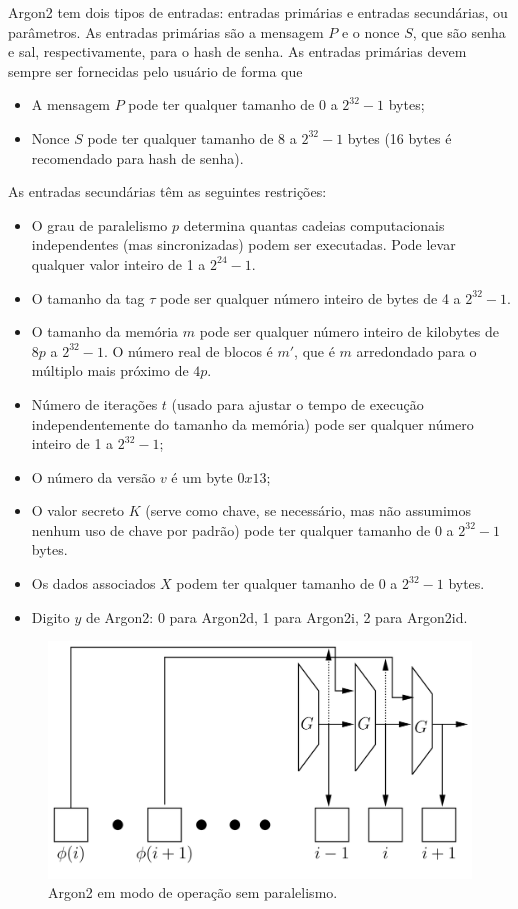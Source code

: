 \documentclass[conference]{IEEEtran}
\begin{document}
Argon2 tem dois tipos de entradas: entradas primárias e entradas secundárias, ou parâmetros. 
As entradas primárias são a mensagem $P$ e o nonce $S$, que são senha e sal, respectivamente, para o 
hash de senha. As entradas primárias devem sempre ser fornecidas pelo usuário de forma que
\begin{itemize}
\item A mensagem $P$ pode ter qualquer tamanho de $0$ a $2^{32}-1$ bytes;
\item Nonce $S$ pode ter qualquer tamanho de $8$ a $2^{32}-1$ bytes (16 bytes é recomendado para hash de senha).
\end{itemize}
As entradas secundárias têm as seguintes restrições:
\begin{itemize}
\item O grau de paralelismo $p$ determina quantas cadeias computacionais independentes (mas sincronizadas) 
podem ser executadas. Pode levar qualquer valor inteiro de 1 a $2^{24}-1$.
\item O tamanho da tag $\tau$ pode ser qualquer número inteiro de bytes de 4 a $2^{32}-1$.
\item O tamanho da memória $m$ pode ser qualquer número inteiro de kilobytes de $8p$ a $2^{32}-1$. O número 
real de blocos é $m'$, que é $m$ arredondado para o múltiplo mais próximo de $4p$.
\item Número de iterações $t$ (usado para ajustar o tempo de execução independentemente do tamanho da memória) 
pode ser qualquer número inteiro de 1 a $2^{32}-1$;
\item O número da versão $v$ é um byte $0x13$;
\item O valor secreto $K$ (serve como chave, se necessário, mas não assumimos nenhum uso de chave por padrão) 
pode ter qualquer tamanho de $0$ a $2^{32}-1$ bytes.
\item Os dados associados $X$ podem ter qualquer tamanho de $0$ a $2^{32}-1$ bytes.
\item Digito $y$ de Argon2: 0 para Argon2d, 1 para Argon2i, 2 para Argon2id.
\end{itemize}

\begin{figure}[ht]
\centering
\includegraphics[scale=0.1]{assets/argon2-no-parallelism.png}
\caption{Argon2 em modo de operação sem paralelismo. }\label{fig:generic}
\end{figure}
\end{document}
